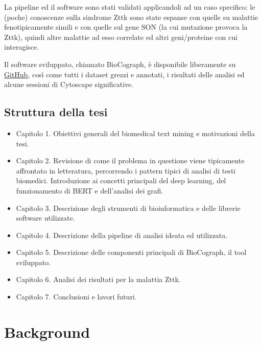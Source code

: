 \documentclass[12pt]{report}
\begin{document}
La pipeline ed il software sono stati validati applicandoli ad un caso specifico: le (poche) conoscenze sulla sindrome Zttk sono state espanse con quelle su malattie fenotipicamente simili e con quelle sul gene SON (la cui mutazione provoca la Zttk), quindi altre malattie ad esso correlate ed altri geni/proteine con cui interagisce.

Il software sviluppato, chiamato BioCograph, è disponibile liberamente su \href{https://github.com/matteotolloso/biocograph}{GitHub}\cite{biocograph}, così come tutti i dataset grezzi e annotati, i risultati delle analisi ed alcune sessioni di Cytoscape significative. 

\section{Struttura della tesi}

\begin{itemize}

\item Capitolo 1. Obiettivi generali del biomedical text mining e motivazioni della tesi.
\item Capitolo 2. Revisione di come il problema in questione viene tipicamente affrontato in letteratura, percorrendo i pattern tipici di analisi di testi biomedici. Introduzione ai concetti principali del deep learning, del funzionamento di BERT e dell'analisi dei grafi.
\item Capitolo 3. Descrizione degli strumenti di bioinformatica e delle librerie software utilizzate.
\item Capitolo 4. Descrizione della pipeline di analisi ideata ed utilizzata.
\item Capitolo 5. Descrizione delle componenti principali di BioCograph, il tool sviluppato.
\item Capitolo 6. Analisi dei risultati per la malattia Zttk.
\item Capitolo 7. Conclusioni e lavori futuri.

\end{itemize}




\chapter{Background}
\end{document}
